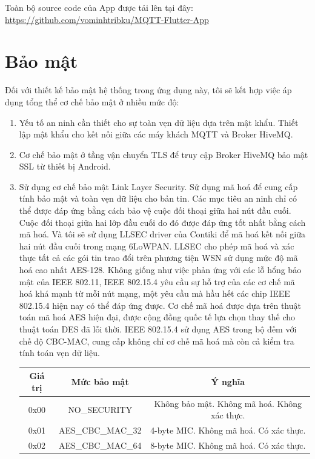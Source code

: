 \documentclass{report}
\begin{document}
Toàn bộ source code của App được tải lên tại đây: \url{https://github.com/vominhtribku/MQTT-Flutter-App}

\section{Bảo mật}
Đối với thiết kế bảo mật hệ thống trong ứng dụng này, tôi sẽ kết hợp việc áp dụng
tổng thể cơ chế bảo mật ở nhiều mức độ:
\begin{enumerate}
	\item Yếu tố an ninh cần thiết cho sự toàn vẹn dữ liệu dựa trên mật khẩu. Thiết lập
	mật khẩu cho kết nối giữa các máy khách MQTT và Broker HiveMQ.
	\item Cơ chế bảo mật ở tầng vận chuyển TLS để truy cập Broker HiveMQ
	bảo mật SSL từ thiết bị Android.
	\item Sử dụng cơ chế bảo mật Link Layer Security. Sử dụng mã hoá để cung cấp tính bảo mật
	và toàn vẹn dữ liệu cho bản tin. Các mục tiêu an ninh chỉ có thể được đáp ứng
	bằng cách bảo vệ cuộc đối thoại giữa hai nút đầu cuối. Cuộc đối thoại giữa hai
	lớp đầu cuối do đó được đáp ứng tốt nhất bằng cách mã hoá. Và tôi sẽ sử dụng
	LLSEC driver của Contiki để mã hoá kết nối giữa hai nút đầu cuối trong mạng
	6LoWPAN. LLSEC cho phép mã hoá và xác thực tất cả các gói tin trao đổi trên
	phương tiện WSN sử dụng mức độ mã hoá cao nhất AES-128. Không giống như
	việc phản ứng với các lỗ hổng bảo mật của IEEE 802.11, IEEE 802.15.4 yêu cầu
	sự hỗ trợ của các cơ chế mã hoá khá mạnh từ mỗi nút mạng, một yêu cầu mà hầu
	hết các chip IEEE 802.15.4 hiện nay có thể đáp ứng được. Cơ chế mã hoá được
	dựa trên thuật toán mã hoá AES hiện đại, được cộng đồng quốc tế lựa chọn thay
	thế cho thuật toán DES đã lỗi thời. IEEE 802.15.4 sử dụng AES trong bộ đếm
	với chế độ CBC-MAC, cung cấp không chỉ cơ chế mã hoá mà còn
	cả kiểm tra tính toán vẹn dữ liệu. \\
	\begin{table}[h]
		\centering
		\label{tab:tb3}
		\begin{tabular}{|c|c|c|}
			\hline
			\textbf{Giá trị} & \textbf{Mức bảo mật} & \textbf{Ý nghĩa}                             \\ \hline
			0x00             & NO\_SECURITY          & Không bảo mật. Không mã hoá. Không xác thực. \\ \hline
			0x01             & AES\_CBC\_MAC\_32       & 4-byte MIC. Không mã hoá. Có xác thực.       \\ \hline
			0x02             & AES\_CBC\_MAC\_64       & 8-byte MIC. Không mã hoá. Có xác thực.       \\ \hline

\end{tabular}
\end{table}
\end{enumerate}
\end{document}
